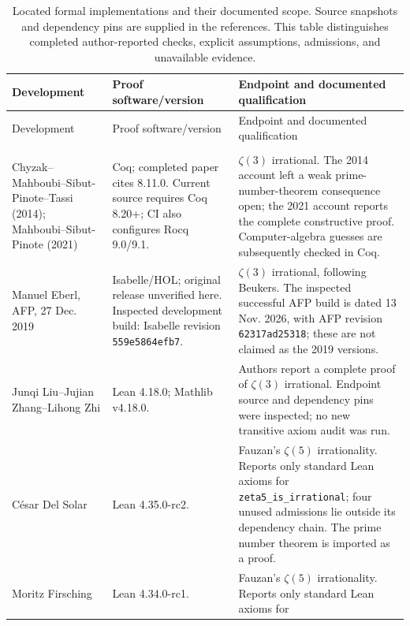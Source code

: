 \documentclass[11pt,letterpaper]{article}
\theoremstyle{definition}
\begin{document}
\begingroup
\footnotesize
\renewcommand{\arraystretch}{1.18}
\begin{longtable}{@{}>{\raggedright\arraybackslash}p{}>{\raggedright\arraybackslash}p{}>{\raggedright\arraybackslash}p{}@{}}
\caption{Located formal implementations and their documented scope.
Source snapshots and dependency pins are supplied in the references.
This table distinguishes completed author-reported checks, explicit
assumptions, admissions, and unavailable evidence.}
\label{tab:history-formal}\\
\toprule
Development & Proof software/version & Endpoint and documented qualification\\
\midrule
\endfirsthead
\toprule
Development & Proof software/version & Endpoint and documented qualification\\
\midrule
\endhead
\midrule
\multicolumn{3}{r}{\emph{Continued on the next page}}\\
\endfoot
\bottomrule
\endlastfoot
Chyzak--Mahboubi--Sibut-Pinote--Tassi (2014); Mahboubi--Sibut-Pinote (2021)
\cite{chyzak2014,mahboubi2021,aperysource} & Coq; completed paper cites
8.11.0.  Current source requires Coq 8.20+; CI also configures Rocq 9.0/9.1.
& $\zeta(3)$ irrational.  The 2014 account left a weak prime-number-theorem
consequence open; the 2021 account reports the complete constructive
proof.  Computer-algebra guesses are subsequently checked in Coq.\\
Manuel Eberl, AFP, 27 Dec. 2019 \cite{eberl2019} & Isabelle/HOL;
original release unverified here.  Inspected development build:
Isabelle revision \texttt{559e5864efb7}. & $\zeta(3)$ irrational, following
Beukers.  The inspected successful AFP build is dated 13 Nov. 2026, with
AFP revision \texttt{62317ad25318}; these are not claimed as the 2019
versions.\\
Junqi Liu--Jujian Zhang--Lihong Zhi \cite{liuzhangzhi2025} & Lean 4.18.0;
Mathlib v4.18.0. & Authors report a complete proof of $\zeta(3)$
irrational.  Endpoint source and dependency pins were inspected;
no new transitive axiom audit was run.\\
C\'esar Del Solar \cite{delsolar2026} & Lean 4.35.0-rc2. & Fauzan's
$\zeta(5)$ irrationality.  Reports only standard Lean axioms for
\texttt{zeta5\_is\_irrational}; four unused admissions lie outside its
dependency chain.  The prime number theorem is imported as a proof.\\
Moritz Firsching \cite{firsching2026} & Lean 4.34.0-rc1. & Fauzan's
$\zeta(5)$ irrationality.  Reports only standard Lean axioms for

\end{longtable}
\end{document}
